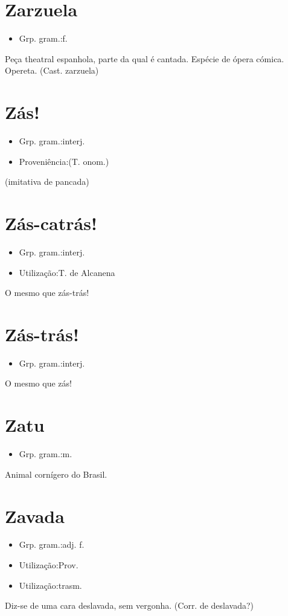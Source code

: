 \section{Zarzuela}
\begin{itemize}
\item {Grp. gram.:f.}
\end{itemize}
Peça theatral espanhola, parte da qual é cantada.
Espécie de ópera cómica.
Opereta.
(Cast. \textunderscore zarzuela\textunderscore )
\section{Zás!}
\begin{itemize}
\item {Grp. gram.:interj.}
\end{itemize}
\begin{itemize}
\item {Proveniência:(T. onom.)}
\end{itemize}
(imitativa de pancada)
\section{Zás-catrás!}
\begin{itemize}
\item {Grp. gram.:interj.}
\end{itemize}
\begin{itemize}
\item {Utilização:T. de Alcanena}
\end{itemize}
O mesmo que \textunderscore zás-trás!\textunderscore 
\section{Zás-trás!}
\begin{itemize}
\item {Grp. gram.:interj.}
\end{itemize}
O mesmo que \textunderscore zás!\textunderscore 
\section{Zatu}
\begin{itemize}
\item {Grp. gram.:m.}
\end{itemize}
Animal cornígero do Brasil.
\section{Zavada}
\begin{itemize}
\item {Grp. gram.:adj. f.}
\end{itemize}
\begin{itemize}
\item {Utilização:Prov.}
\end{itemize}
\begin{itemize}
\item {Utilização:trasm.}
\end{itemize}
Diz-se de uma cara deslavada, sem vergonha.
(Corr. de \textunderscore deslavada\textunderscore ?)
